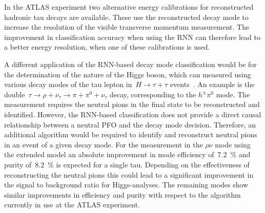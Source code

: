 In the ATLAS experiment two alternative energy calibrations for reconstructed
hadronic tau decays are available. These use the reconstructed decay mode to
increase the resolution of the visible transverse momentum measurement. The
improvement in classification accuracy when using the RNN can therefore lead to
a better energy resolution, when one of these calibrations is used.

A different application of the RNN-based decay mode classification would be for
the determination of the \cp nature of the Higgs boson, which can
measured using various decay modes of the tau lepton in~$H \to \tau + \tau$
events~\cite{Berge2014}. An example is the
double~$\tau \to \rho + \nu_\tau \to \pi + \pi^0 + \nu_\tau$ decay,
corresponding to the $h^\pm \pi^0$ mode. The \cp measurement requires
the neutral pions in the final state to be reconstructed and identified.
However, the RNN-based classification does not provide a direct causal
relationship between a neutral PFO and the decay mode decision. Therefore, an
additional algorithm would be required to identify and reconstruct neutral pions
in an event of a given decay mode. For the \cp measurement in the
$\rho\nu$ mode using the extended model an absolute improvement in mode
efficiency of~\SI{7.2}{\percent} and purity of~\SI{8.2}{\percent} is expected
for a single tau. Depending on the effectiveness of reconstructing the neutral
pions this could lead to a significant improvement in the signal to background
ratio for Higgs-\cp analyses. The remaining modes show similar
improvements in efficiency and purity with respect to the algorithm currently in
use at the ATLAS experiment.

